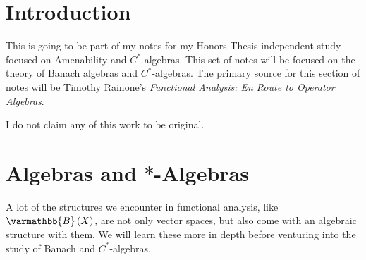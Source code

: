 \documentclass[10pt]{mypackage}
\renewcommand*{\mathbb}[1]{\varmathbb{#1}}
\newcommand{\B}{\mathbb{B}}
\begin{document}
\RaggedRight
\tableofcontents
\section{Introduction}%
This is going to be part of my notes for my Honors Thesis independent study focused on Amenability and $C^{\ast}$-algebras. This set of notes will be focused on the theory of Banach algebras and $C^{\ast}$-algebras. The primary source for this section of notes will be Timothy Rainone's \textit{Functional Analysis: En Route to Operator Algebras}.\newline

I do not claim any of this work to be original.
\section{Algebras and $\ast$-Algebras}%
A lot of the structures we encounter in functional analysis, like $\B\left(X\right)$, are not only vector spaces, but also come with an algebraic structure with them. We will learn these more in depth before venturing into the study of Banach and $C^{\ast}$-algebras.
\end{document}
